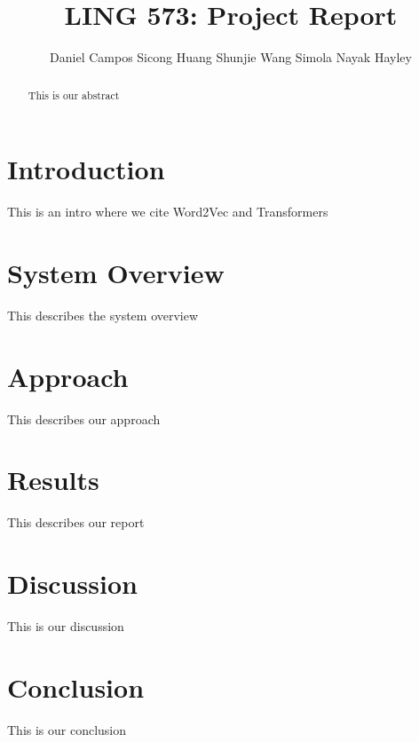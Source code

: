 \documentclass[11pt,a4paper]{article}
\title{LING 573: Project Report}
\author{Daniel Campos \And Sicong Huang \And Shunjie Wang \And Simola Nayak \And Hayley}
\begin{document}
\maketitle
\begin{abstract}
This is our abstract
\end{abstract}
\section{Introduction}
This is an intro where we cite Word2Vec \cite{Mikolov2013DistributedRO} and Transformers \cite{Wolf2019HuggingFacesTS}
\section{System Overview}
This describes the system overview
\section{Approach}
This describes our approach
\section{Results}
This describes our report
\section{Discussion}
This is our discussion
\section{Conclusion}
This is our conclusion


\end{document}
